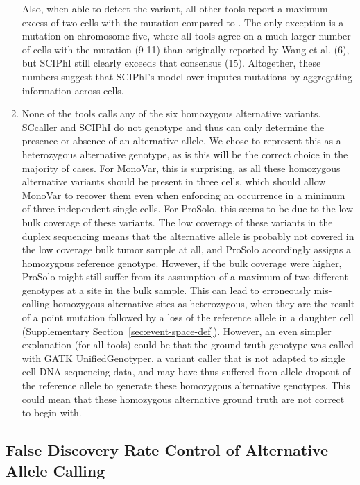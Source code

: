 \documentclass[authoryear,preprint,11pt]{scrartcl}
\begin{document}
\begin{enumerate}
  Also, when able to detect the variant, all other tools report a maximum excess of two cells with the mutation compared to \cite{wang_clonal_2014}.
  The only exception is a mutation on chromosome five, where all tools agree on a much larger number of cells with the mutation (9-11) than originally reported by Wang et al. (6), but SCIPhI still clearly exceeds that consensus (15).
  Altogether, these numbers suggest that SCIPhI's model over-imputes mutations by aggregating information across cells.
  \item None of the tools calls any of the six homozygous alternative variants.
  SCcaller and SCIPhI do not genotype and thus can only determine the presence or absence of an alternative allele.
  We chose to represent this as a heterozygous alternative genotype, as is this will be the correct choice in the majority of cases.
  For MonoVar, this is surprising, as all these homozygous alternative variants should be present in three cells, which should allow MonoVar to recover them even when enforcing an occurrence in a minimum of three independent single cells.
  For ProSolo, this seems to be due to the low bulk coverage of these variants.
  The low coverage of these variants in the duplex sequencing means that the alternative allele is probably not covered in the low coverage bulk tumor sample at all, and ProSolo accordingly assigns a homozygous reference genotype.
  However, if the bulk coverage were higher, ProSolo might still suffer from its assumption of a maximum of two different genotypes at a site in the bulk sample.
  This can lead to erroneously mis-calling homozygous alternative sites as heterozygous, when they are the result of a point mutation followed by a loss of the reference allele in a daughter cell (Supplementary Section~\ref{sec:event-space-def}).
  However, an even simpler explanation (for all tools) could be that the ground truth genotype was called with GATK UnifiedGenotyper, a variant caller that is not adapted to single cell DNA-sequencing data, and may have thus suffered from allele dropout of the reference allele to generate these homozygous alternative genotypes.
  This could mean that these homozygous alternative ground truth are not correct to begin with.
\end{enumerate}

\subsection{False Discovery Rate Control of Alternative Allele Calling} \label{sec:fdr-of-alt-calling}
\end{document}
